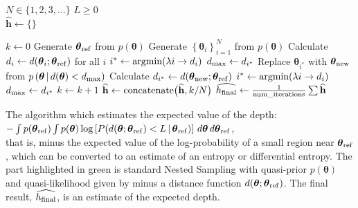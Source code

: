 \documentclass[entropy,article,accept,oneauthor,pdftex,10pt,a4paper]{mdpi}
\newcommand{\x}{\boldsymbol{\theta}}
\newcommand{\xref}{\x_{\rm ref}}
\begin{document}
\begin{algorithm}
\begin{algorithmic}
\State $N \in \{1, 2, 3, ... \}$
\State $L \geq 0$
             \\
\hrulefill
\State $\widehat{\mathbf{h}} \leftarrow \{\}$

    \State $k \leftarrow 0$
    \State Generate $\xref$ from $p(\x)$
\color{green}
    \State Generate $\left\{\x_i\right\}_{i=1}^N$ from $p(\x)$
    \State Calculate $d_i \leftarrow d(\x_i; \xref)$ for all $i$
    \State $i^* \leftarrow \textnormal{argmin}(\lambda i \rightarrow d_i)$
    \State $d_{\rm max} \leftarrow d_{i^*}$
        \State Replace $\x_{i^*}$ with $\x_{\rm new}$ from
               $p\left(\x \,|\, d(\x) < d_{\rm max}\right)$
        \State Calculate $d_{i^*} \leftarrow d(\x_{\rm new}; \xref)$
        \State $i^* \leftarrow \textnormal{argmin}(\lambda i \rightarrow d_i)$
        \State $d_{\rm max} \leftarrow d_{i^*}$
        \State $k \leftarrow k+1$
    \EndWhile
\color{black}
    \State $\widehat{\mathbf{h}} \leftarrow \textnormal{concatenate}\big(\widehat{\mathbf{h}}, k/N\big)$
\EndWhile
\State $\widehat{h_{\rm final}} \leftarrow \frac{1}{\rm num\_iterations} \sum \widehat{\mathbf{h}}$
\end{algorithmic}
\caption{The algorithm which estimates the expected value of the depth:\\
           \quad\quad$-\int p(\xref) \int p(\x)
            \log \left[ P(d(\x; \xref) < L \,|\, \xref) \right]
                        \, d\x \, d\xref$,\\ that is, minus the expected value of the
        log-probability of a small region near $\xref$, which can be converted
        to an estimate of an entropy or differential entropy.
        The part highlighted in green is standard Nested Sampling
        with quasi-prior $p(\x)$ and quasi-likelihood given by minus a
        distance function $d(\x; \xref)$. The final result, $\widehat{h_{\rm final}}$, is an estimate of the expected depth.
        \label{alg:algorithm}}
\end{algorithm}
\end{document}
